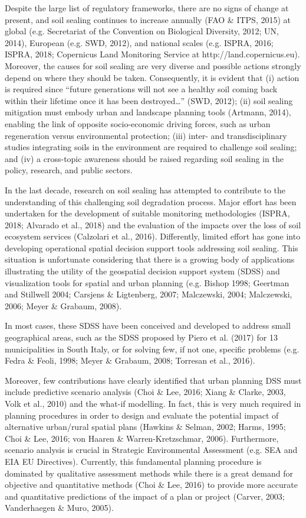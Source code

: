 \documentclass[APA,LATO1COL,doublespace]{WileyNJD-v2}
\begin{document}
Despite the large list of regulatory frameworks, there are no signs of change at present, and soil sealing continues to increase annually (FAO \& ITPS, 2015) at global (e.g. Secretariat of the Convention on Biological Diversity, 2012; UN, 2014), European (e.g. SWD, 2012), and national scales (e.g. ISPRA, 2016; ISPRA, 2018; Copernicus Land Monitoring Service at http://land.copernicus.eu).
Moreover, the causes for soil sealing are very diverse and possible actions strongly depend on where they should be taken. Consequently, it is evident that (i) action is required since “future generations will not see a healthy soil coming back within their lifetime once it has been destroyed…” (SWD, 2012); (ii) soil sealing mitigation must embody urban and landscape planning tools (Artmann, 2014), enabling the link of opposite socio-economic driving forces, such as urban regeneration versus environmental protection; (iii) inter- and transdisciplinary studies integrating soils in the environment are required to challenge soil sealing; and (iv) a cross-topic awareness should be raised regarding soil sealing in the policy, research, and public sectors.

In the last decade, research on soil sealing has attempted to contribute to the understanding of this challenging soil degradation process. Major effort has been undertaken for the development of suitable monitoring methodologies (ISPRA, 2018; Alvarado et al., 2018) and the evaluation of the impacts over the loss of soil ecosystem services (Calzolari et al., 2016). Differently, limited effort has gone into developing operational spatial decision support tools addressing soil sealing.
This situation is unfortunate considering that there is a growing body of applications illustrating the utility of the geospatial decision support system (SDSS) and visualization tools for spatial and urban planning (e.g. Bishop 1998; Geertman and Stillwell 2004; Carsjens \& Ligtenberg, 2007; Malczewski, 2004; Malczewski, 2006; Meyer \& Grabaum, 2008).

In most cases, these SDSS have been conceived and developed to address small geographical areas, such as the SDSS proposed by Piero et al. (2017) for 13 municipalities in South Italy, or for solving few, if not one, specific problems (e.g. Fedra \& Feoli, 1998; Meyer \& Grabaum, 2008; Torresan et al., 2016).

Moreover, few contributions have clearly identified that urban planning DSS must include predictive scenario analysis (Choi \& Lee, 2016; Xiang \& Clarke, 2003, Volk et al., 2010) and the what-if modelling. In fact, this is very much required in planning procedures in order to design and evaluate the potential impact of alternative urban/rural spatial plans (Hawkins \& Selman, 2002; Harms, 1995; Choi \& Lee, 2016; von Haaren \& Warren-Kretzschmar, 2006). Furthermore, scenario analysis is crucial in Strategic Environmental Assessment (e.g. SEA and EIA EU Directives). Currently, this fundamental planning procedure is dominated by qualitative assessment methods while there is a great demand for objective and quantitative methods (Choi \& Lee, 2016) to provide more accurate and quantitative predictions of the impact of a plan or project (Carver, 2003; Vanderhaegen \& Muro, 2005).
\end{document}

